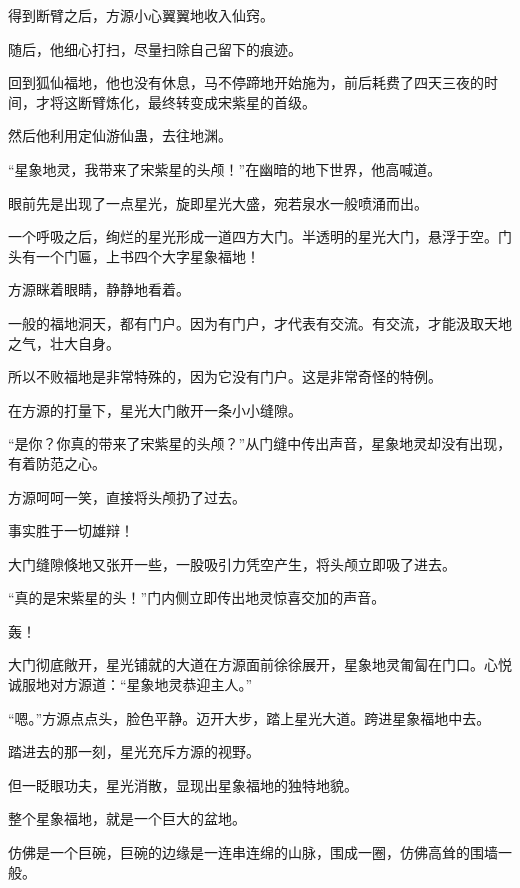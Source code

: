 
\begin{this_body}



得到断臂之后，方源小心翼翼地收入仙窍。

随后，他细心打扫，尽量扫除自己留下的痕迹。

回到狐仙福地，他也没有休息，马不停蹄地开始施为，前后耗费了四天三夜的时间，才将这断臂炼化，最终转变成宋紫星的首级。

然后他利用定仙游仙蛊，去往地渊。

“星象地灵，我带来了宋紫星的头颅！”在幽暗的地下世界，他高喊道。

眼前先是出现了一点星光，旋即星光大盛，宛若泉水一般喷涌而出。

一个呼吸之后，绚烂的星光形成一道四方大门。半透明的星光大门，悬浮于空。门头有一个门匾，上书四个大字星象福地！

方源眯着眼睛，静静地看着。

一般的福地洞天，都有门户。因为有门户，才代表有交流。有交流，才能汲取天地之气，壮大自身。

所以不败福地是非常特殊的，因为它没有门户。这是非常奇怪的特例。

在方源的打量下，星光大门敞开一条小小缝隙。

“是你？你真的带来了宋紫星的头颅？”从门缝中传出声音，星象地灵却没有出现，有着防范之心。

方源呵呵一笑，直接将头颅扔了过去。

事实胜于一切雄辩！

大门缝隙倏地又张开一些，一股吸引力凭空产生，将头颅立即吸了进去。

“真的是宋紫星的头！”门内侧立即传出地灵惊喜交加的声音。

轰！

大门彻底敞开，星光铺就的大道在方源面前徐徐展开，星象地灵匍匐在门口。心悦诚服地对方源道：“星象地灵恭迎主人。”

“嗯。”方源点点头，脸色平静。迈开大步，踏上星光大道。跨进星象福地中去。

踏进去的那一刻，星光充斥方源的视野。

但一眨眼功夫，星光消散，显现出星象福地的独特地貌。

整个星象福地，就是一个巨大的盆地。

仿佛是一个巨碗，巨碗的边缘是一连串连绵的山脉，围成一圈，仿佛高耸的围墙一般。


\end{this_body}
